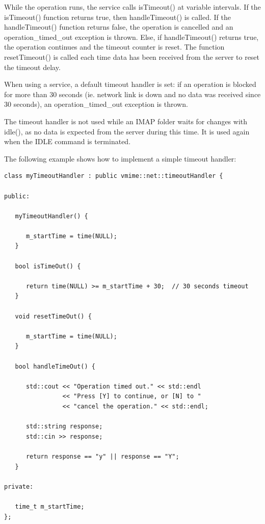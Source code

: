 While the operation runs, the service calls {\vcode isTimeout()} at variable
intervals. If the {\vcode isTimeout()} function returns {\vcode true},
then {\vcode handleTimeout()} is called. If the {\vcode handleTimeout()}
function returns {\vcode false}, the operation is cancelled and
an {\vcode operation\_timed\_out} exception is thrown. Else, if
{\vcode handleTimeout()} returns true, the operation continues and the
timeout counter is reset.
The function {\vcode resetTimeout()} is called each time data has
been received from the server to reset the timeout delay.

When using a service, a default timeout handler is set: if an operation
is blocked for more than 30 seconds (ie. network link is down and no data
was received since 30 seconds), an {\vcode operation\_timed\_out} exception
is thrown.

The timeout handler is not used while an IMAP folder waits for changes with
{\vcode idle()}, as no data is expected from the server during this time. It
is used again when the IDLE command is terminated.

The following example shows how to implement a simple timeout handler:

\begin{lstlisting}[caption={Implementing a simple timeout handler}]
class myTimeoutHandler : public vmime::net::timeoutHandler {

public:

   myTimeoutHandler() {

      m_startTime = time(NULL);
   }

   bool isTimeOut() {

      return time(NULL) >= m_startTime + 30;  // 30 seconds timeout
   }

   void resetTimeOut() {

      m_startTime = time(NULL);
   }

   bool handleTimeOut() {

      std::cout << "Operation timed out." << std::endl
                << "Press [Y] to continue, or [N] to "
                << "cancel the operation." << std::endl;

      std::string response;
      std::cin >> response;

      return response == "y" || response == "Y";
   }

private:

   time_t m_startTime;
};
\end{lstlisting}

